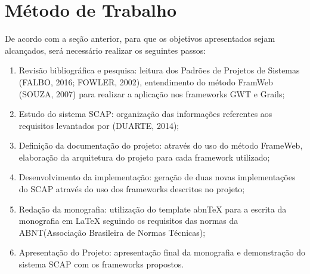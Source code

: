 
\section{Método de Trabalho}
\label{sec-metodo}


	
	

De acordo com a seção anterior, para que os objetivos apresentados sejam alcançados, será necessário realizar os seguintes passos:

\begin{enumerate}

    \item Revisão bibliográfica e pesquisa: leitura dos Padrões de Projetos de Sistemas (FALBO, 2016; FOWLER, 2002), entendimento do método FramWeb (SOUZA, 2007) para realizar a aplicação nos frameworks GWT e Grails;
    \item Estudo do sistema SCAP: organização das informações referentes aos requisitos levantados por (DUARTE, 2014);
    \item Definição da documentação do projeto: através do uso do método FrameWeb, elaboração da arquitetura do projeto para cada framework utilizado;
    \item Desenvolvimento da implementação: geração de duas novas implementações do SCAP através do uso dos frameworks descritos no projeto; 
    \item Redação da monografia: utilização do template abnTeX para a escrita da monografia em LaTeX seguindo os requisitos das normas da ABNT(Associação Brasileira de Normas Técnicas);
    \item Apresentação do Projeto: apresentação final da monografia e demonstração do sistema SCAP com os frameworks propostos.

\end{enumerate}    
    